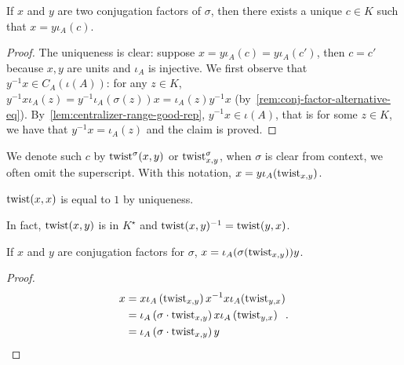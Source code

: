 \begin{lemma}\label{lem:twist-spec1}
  If $x$ and $y$ are two conjugation factors of $\sigma$, then there exists a unique $c \in K$ such that $x = y\iota_{A}(c)$.
  \leanok
\end{lemma}

\begin{proof}
  The uniqueness is clear: suppose $x = y\iota_{A}(c)=y\iota_{A}(c')$, then $c = c'$ because $x, y$ are units and $\iota_{A}$ is injective. We first observe that $y^{-1}x\in C_{A}(\iota(A))$: for any $z \in K$, $y^{-1}x\iota_{A}(z)=y^{-1}\iota_{A}(\sigma(z))x=\iota_{A}(z)y^{-1}x$ (by~\cref{rem:conj-factor-alternative-eq}). By~\cref{lem:centralizer-range-good-rep}, $y^{-1}x\in \iota(A)$, that is for some $z \in K$, we have that $y^{-1}x = \iota_{A}(z)$ and the claim is proved.
\end{proof}

We denote such $c$ by $\operatorname{twist}^{\sigma}(x, y)$ or $\operatorname{twist}^{\sigma}_{x, y}$, when $\sigma$ is clear from context, we often omit the superscript. With this notation, $x = y\iota_{A}(\operatorname{twist}_{x,y})$.

\begin{remark}
  $\operatorname{twist}(x, x)$ is equal to $1$ by uniqueness.
\end{remark}

\begin{remark}
  In fact, $\operatorname{twist}(x, y)$ is in $K^{\star}$ and $\operatorname{twist}(x, y)^{-1}=\operatorname{twist}(y, x)$.
\end{remark}

\begin{lemma}\label{lem:twist-spec2}
  If $x$ and $y$ are conjugation factors for $\sigma$, $x=\iota_{A}(\sigma(\operatorname{twist}_{x, y}))y$.
  \leanok
\end{lemma}
\begin{proof}
  \[
    \begin{aligned}
      x &= x \iota_{A}\left(\operatorname{twist}_{x,y}\right) x^{-1} x \iota_{A}(\operatorname{twist}_{y,x}) \\
        &= \iota_{A}\left(\sigma\cdot\operatorname{twist}_{x,y}\right)x\iota_{A}\left(
          \operatorname{twist}_{y,x}\right)\\
      &=\iota_{A}\left(\sigma\cdot \operatorname{twist}_{x,y}\right)y
    \end{aligned}.
  \]
\end{proof}

